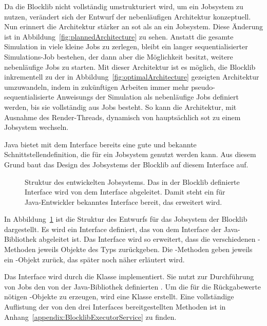 Da die Blocklib nicht vollständig umstrukturiert wird, um ein Jobsystem zu nutzen, verändert sich der Entwurf der nebenläufigen Architektur konzeptuell. Nun erinnert die Architektur stärker an \ac{sot} als an ein Jobsystem. Diese Änderung ist in Abbildung~\ref{fig:plannedArchitecture} zu sehen. Anstatt die gesamte Simulation in viele kleine Jobs zu zerlegen, bleibt ein langer sequentialisierter Simulations-Job bestehen, der dann aber die Möglichkeit besitzt, weitere nebenläufige Jobs zu starten. Mit dieser Architektur ist es möglich, die Blocklib inkrementell zu der in Abbildung~\ref{fig:optimalArchitecture} gezeigten Architektur umzuwandeln, indem in zukünftigen Arbeiten immer mehr pseudo-sequentialisierte \glspl{Anweisung} der Simulation als nebenläufige Jobs definiert werden, bis sie vollständig aus Jobs besteht. So kann die Architektur, mit Ausnahme des Render-Threads, dynamisch von hauptsächlich \ac{sot} zu einem Jobsystem wechseln.

Java bietet mit dem Interface \classScheduledExecutorService{} bereits eine gute und bekannte Schnittstellendefinition, die für ein Jobsystem genutzt werden kann. Aus diesem Grund baut das Design des Jobsystems der Blocklib auf diesem Interface auf. 

\begin{figure}
	
	\caption[Struktur des entwickelten Jobsystems.]{Struktur des entwickelten Jobsystems. Das in der Blocklib definierte Interface wird von dem Interface \classScheduledExecutorService{} abgeleitet. Damit steht ein für Java-Entwickler bekanntes Interface bereit, das erweitert wird.}\label{fig:GrobesDesign}
\end{figure}

In Abbildung~\ref{fig:GrobesDesign} ist die Struktur des Entwurfs für das Jobsystem der Blocklib dargestellt. Es wird ein Interface \classBlocklibExecutorService{} definiert, das von dem Interface \classScheduledExecutorService{} der Java-Bibliothek abgeleitet ist. Das Interface wird so erweitert, dass die verschiedenen -Methoden jeweils Objekte des Typs \classCompletableFuture{} zurückgeben. Die -Methoden geben jeweils ein \classScheduledCompletableFuture{}-Objekt zurück, das später noch näher erläutert wird.

Das Interface \classBlocklibExecutorService{} wird durch die Klasse \classBlocklibExecutor{} implementiert. Sie nutzt zur Durchführung von Jobs den von der Java-Bibliothek definierten \classScheduledThreadPoolExecutor{}. Um die für die Rückgabewerte nötigen \classCompletableFuture{}-Objekte zu erzeugen, wird eine Klasse \classCompletableFutureWrapper{} erstellt. Eine vollständige Auflistung der von den drei Interfaces bereitgestellten Methoden ist in Anhang~\vref{appendix:BlocklibExecutorService} zu finden. 

